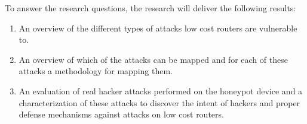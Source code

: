 To answer the research questions, the research will deliver the following results:
\begin{enumerate}
    \item An overview of the different types of attacks low cost routers are vulnerable to.
    \item An overview of which of the attacks can be mapped and for each of these attacks a methodology for mapping them.
    \item An evaluation of real hacker attacks performed on the honeypot device and a characterization of these attacks to discover the intent of hackers and proper defense mechanisms against attacks on low cost routers.
\end{enumerate}